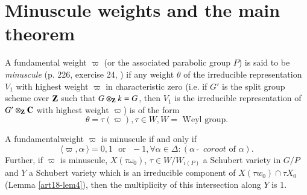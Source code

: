 \section{Minuscule weights and the main theorem}\label{art18-sec5}
\begin{definition}\label{art18-defi5}
A fundamental weight $\varpi$ (or the associated parabolic group $P$) is said to be {\em minuscule} (\cf p. 226, exercise 24, \cite{art18-key4}) if any weight $\theta$ of the irreducible representation $V_1$ with highest weight $\varpi$ in characteristic zero (i.e. if $G'$ is the split group scheme over $\mathbf{Z}$ such that $G \otimes_{\mathbf{Z}} k = G$, then $V_1$ is the irreducible representation of $G'\otimes_{\mathbf{Z}} \mathbf{C}$ with highest weight $\varpi$) is of the form
$$
\theta = \tau (\varpi), \tau \in W, W = \text{ Weyl group}.
$$
\end{definition}

\begin{prop}\label{art18-prop4}
A fundamental\pageoriginale weight $\varpi$ is minuscule if and only if 
$$
\langle \varpi, \alpha\check  ~\rangle = 0, 1 \text{~ or ~} - 1, \forall \alpha \in \Delta: (\alpha\check   \quad coroot \text{ of }  \alpha).
$$
Further, if $\varpi$ is minuscule, $X(\tau\omega_0)$, $\tau \in W/ W_{i(P)}$ a Schubert variety in $G/P$ and $Y$ a Schubert variety which is an irreducible component of $X(\tau w_0) \cap \tau X_0$ (\cf Lemma \ref{art18-lem4}), then the multiplicity of this intersection along $Y$ is 1.
\end{prop}

